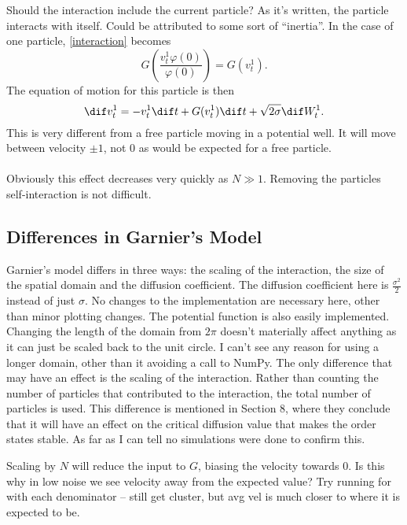 \documentclass[11pt,a4paper,dvipsnames]{article}
\renewcommand{\phi}{\varphi}
\begin{document}
        \begin{boxnote}
            Should the interaction include the current particle? As it's written, the particle interacts with itself. Could be attributed to some sort of ``inertia''. In the case of one particle, \eqref{interaction} becomes  
            \[ G\left(\frac{v^1_t\phi(0)}{\phi(0)}\right) = G(v^1_t).\]
            The equation of motion for this particle is then 
            \[\dif v^1_t = -v^1_t \dif t + G(v^1_t) \dif t +\sqrt{2\sigma}\dif W^1_t.\]
            This is very different from a free particle moving in a potential well. It will move between velocity $\pm1$, not 0 as would be expected for a free particle. \\
            \\
            Obviously this effect decreases very quickly as $N \gg 1$. Removing the particles self-interaction is not difficult.
        \end{boxnote}
        \subsection{Differences in Garnier's Model}
            Garnier's model differs in three ways: the scaling of the interaction, the size of the spatial domain and the diffusion coefficient. The diffusion coefficient here is $\frac{\sigma^2}{2}$ instead of just $\sigma$. No changes to the implementation are necessary here, other than minor plotting changes. The potential function is also easily implemented. Changing the length of the domain from $2\pi$ doesn't materially affect anything as it can just be scaled back to the unit circle. I can't see any reason for using a longer domain, other than it avoiding a call to NumPy. The only difference that may have an effect is the scaling of the interaction. Rather than counting the number of particles that contributed to the interaction, the total number of particles is used. This difference is mentioned in Section 8, where they conclude that it will have an effect on the critical diffusion value that makes the order states stable. As far as I can tell no simulations were done to confirm this.
            \begin{boxnote}
                Scaling by $N$ will reduce the input to $G$, biasing the velocity towards 0. Is this why in low noise we see velocity away from the expected value? Try running for with each denominator -- still get cluster, but avg vel is much closer to where it is expected to be.
            \end{boxnote}
            
\end{document}
